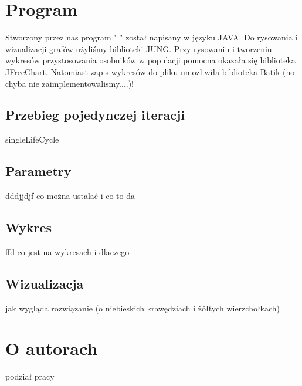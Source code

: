 \documentclass[11pt]{aghdpl}
\begin{document}
\chapter{Program}
\label{cha:program}
Stworzony przez nas program " " został napisany w języku JAVA. Do rysowania i wizualizacji grafów użyliśmy biblioteki JUNG. Przy rysowaniu i tworzeniu wykresów przystosowania osobników w populacji pomocna okazała się biblioteka JFreeChart. Natomiast zapis wykresów do pliku umożliwiła biblioteka Batik (no chyba nie zaimplementowalismy....)!
\section{Przebieg pojedynczej iteracji}
\label{sec:singleLifeCycle}
singleLifeCycle
\section{Parametry}
\label{sec:params}
dddjjdjf
co można ustalać i co to da
\section{Wykres}
\label{sec:chart}
ffd
co jest na wykresach i dlaczego
\section{Wizualizacja}
\label{sec:visualization}
jak wygląda rozwiązanie (o niebieskich krawędziach i żółtych wierzchołkach)

\chapter{O autorach} 
\label{cha:aboutAut}
podział pracy


%
%



% 
% 

%
%
%
%
%
%
\end{document}
